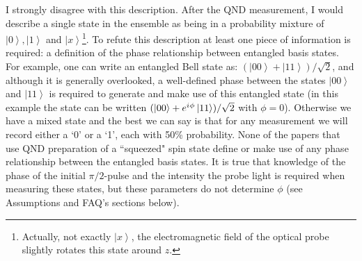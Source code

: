 \documentclass[reqno]{amsart}
\newcommand{\ket}[1]{\left| #1 \right>}
\newcommand{\iu}{{i\mkern1mu}}
\begin{document}
I strongly disagree with this description. After the QND measurement, I would describe a single state in the ensemble as being in a probability mixture of $\ket{0}, \ket{1}$ and $\ket{x}$\footnote{Actually, not exactly $\ket{x}$, the electromagnetic field of the optical probe slightly rotates this state around $z$.}. To refute this description at least one piece of information is required: a definition of the phase relationship between entangled basis states. For example, one can write an entangled Bell state as: $(\ket{00} + \ket{11})/\sqrt{2}$, and although it is generally overlooked, a well-defined phase between the states $\ket{00}$ and $\ket{11}$ is required to generate and make use of this entangled state (in this example the state can be written $(\ket{00} + e^{\iu \phi }\ket{11})/\sqrt{2}$ with $\phi = 0$). Otherwise we have a mixed state and the best we can say is that for any measurement we will record either a `0' or a `1', each with 50\% probability. None of the papers that use QND preparation of a ``squeezed" spin state define or make use of any phase relationship between the entangled basis states. It is true that knowledge of the phase of the initial $\pi/2$-pulse and the intensity the probe light is required when measuring these states, but these parameters do not determine $\phi$ (see Assumptions and FAQ's sections below).
\end{document}
